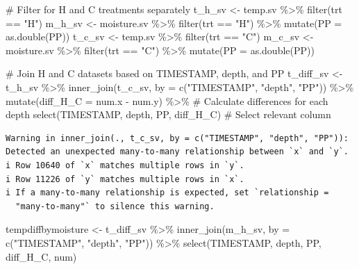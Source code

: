 \documentclass[
  letterpaper,
  DIV=11,
  numbers=noendperiod]{scrartcl}
\newenvironment{Shaded}{\begin{snugshade}}{\end{snugshade}}
\newcommand{\AttributeTok}[1]{\textcolor[rgb]{0.40,0.45,0.13}{#1}}
\newcommand{\CommentTok}[1]{\textcolor[rgb]{0.37,0.37,0.37}{#1}}
\newcommand{\FunctionTok}[1]{\textcolor[rgb]{0.28,0.35,0.67}{#1}}
\newcommand{\NormalTok}[1]{\textcolor[rgb]{0.00,0.23,0.31}{#1}}
\newcommand{\OtherTok}[1]{\textcolor[rgb]{0.00,0.23,0.31}{#1}}
\newcommand{\SpecialCharTok}[1]{\textcolor[rgb]{0.37,0.37,0.37}{#1}}
\newcommand{\StringTok}[1]{\textcolor[rgb]{0.13,0.47,0.30}{#1}}
\begin{document}
\begin{Shaded}
\begin{Highlighting}[]
\CommentTok{\# Filter for H and C treatments separately}
\NormalTok{t\_h\_sv }\OtherTok{\textless{}{-}}\NormalTok{ temp.sv }\SpecialCharTok{\%\textgreater{}\%} \FunctionTok{filter}\NormalTok{(trt }\SpecialCharTok{==} \StringTok{"H"}\NormalTok{)}
\NormalTok{m\_h\_sv }\OtherTok{\textless{}{-}}\NormalTok{ moisture.sv }\SpecialCharTok{\%\textgreater{}\%} \FunctionTok{filter}\NormalTok{(trt }\SpecialCharTok{==} \StringTok{"H"}\NormalTok{) }\SpecialCharTok{\%\textgreater{}\%} \FunctionTok{mutate}\NormalTok{(}\AttributeTok{PP =} \FunctionTok{as.double}\NormalTok{(PP))}
\NormalTok{t\_c\_sv }\OtherTok{\textless{}{-}}\NormalTok{ temp.sv }\SpecialCharTok{\%\textgreater{}\%} \FunctionTok{filter}\NormalTok{(trt }\SpecialCharTok{==} \StringTok{"C"}\NormalTok{)}
\NormalTok{m\_c\_sv }\OtherTok{\textless{}{-}}\NormalTok{ moisture.sv }\SpecialCharTok{\%\textgreater{}\%} \FunctionTok{filter}\NormalTok{(trt }\SpecialCharTok{==} \StringTok{"C"}\NormalTok{) }\SpecialCharTok{\%\textgreater{}\%} \FunctionTok{mutate}\NormalTok{(}\AttributeTok{PP =} \FunctionTok{as.double}\NormalTok{(PP))}


\CommentTok{\# Join H and C datasets based on TIMESTAMP, depth, and PP}
\NormalTok{t\_diff\_sv }\OtherTok{\textless{}{-}}\NormalTok{ t\_h\_sv }\SpecialCharTok{\%\textgreater{}\%}
  \FunctionTok{inner\_join}\NormalTok{(t\_c\_sv, }\AttributeTok{by =} \FunctionTok{c}\NormalTok{(}\StringTok{"TIMESTAMP"}\NormalTok{, }\StringTok{"depth"}\NormalTok{, }\StringTok{"PP"}\NormalTok{)) }\SpecialCharTok{\%\textgreater{}\%}
  \FunctionTok{mutate}\NormalTok{(}\AttributeTok{diff\_H\_C =}\NormalTok{ num.x }\SpecialCharTok{{-}}\NormalTok{ num.y) }\SpecialCharTok{\%\textgreater{}\%}  \CommentTok{\# Calculate differences for each depth}
  \FunctionTok{select}\NormalTok{(TIMESTAMP, depth, PP, diff\_H\_C)  }\CommentTok{\# Select relevant column}
\end{Highlighting}
\end{Shaded}

\begin{verbatim}
Warning in inner_join(., t_c_sv, by = c("TIMESTAMP", "depth", "PP")): Detected an unexpected many-to-many relationship between `x` and `y`.
i Row 10640 of `x` matches multiple rows in `y`.
i Row 11226 of `y` matches multiple rows in `x`.
i If a many-to-many relationship is expected, set `relationship =
  "many-to-many"` to silence this warning.
\end{verbatim}

\begin{Shaded}
\begin{Highlighting}[]
\NormalTok{tempdiffbymoisture }\OtherTok{\textless{}{-}}\NormalTok{ t\_diff\_sv }\SpecialCharTok{\%\textgreater{}\%}
  \FunctionTok{inner\_join}\NormalTok{(m\_h\_sv, }\AttributeTok{by =} \FunctionTok{c}\NormalTok{(}\StringTok{"TIMESTAMP"}\NormalTok{, }\StringTok{"depth"}\NormalTok{, }\StringTok{"PP"}\NormalTok{)) }\SpecialCharTok{\%\textgreater{}\%} 
  \FunctionTok{select}\NormalTok{(TIMESTAMP, depth, PP, diff\_H\_C, num)}
\end{Highlighting}
\end{Shaded}
\end{document}
